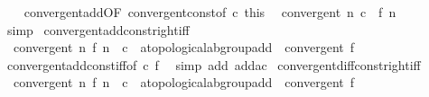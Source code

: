 \begin{isabellebody}
\ \ \isamarkupfalse%
\ convergent{\isacharunderscore}{\kern0pt}add{\isacharbrackleft}{\kern0pt}OF\ convergent{\isacharunderscore}{\kern0pt}const{\isacharbrackleft}{\kern0pt}of\ c{\isacharbrackright}{\kern0pt}\ this{\isacharbrackright}{\kern0pt}\ \isamarkupfalse%
\ {\isachardoublequoteopen}convergent\ {\isacharparenleft}{\kern0pt}{\isasymlambda}n{\isachardot}{\kern0pt}\ c\ {\isacharplus}{\kern0pt}\ f\ n{\isacharparenright}{\kern0pt}{\isachardoublequoteclose}\isanewline
\ \ \ \ \isamarkupfalse%
\ simp\isanewline
{}\isamarkupfalse%
%
\endisatagproof
{\isafoldproof}%
%
\isadelimproof
\isanewline
%
\endisadelimproof
\isanewline
{}\isamarkupfalse%
\ convergent{\isacharunderscore}{\kern0pt}add{\isacharunderscore}{\kern0pt}const{\isacharunderscore}{\kern0pt}right{\isacharunderscore}{\kern0pt}iff{\isacharcolon}{\kern0pt}\isanewline
\ \ {\isachardoublequoteopen}convergent\ {\isacharparenleft}{\kern0pt}{\isasymlambda}n{\isachardot}{\kern0pt}\ f\ n\ {\isacharplus}{\kern0pt}\ c\ {\isacharcolon}{\kern0pt}{\isacharcolon}{\kern0pt}\ {\isacharprime}{\kern0pt}a{\isacharcolon}{\kern0pt}{\isacharcolon}{\kern0pt}topological{\isacharunderscore}{\kern0pt}ab{\isacharunderscore}{\kern0pt}group{\isacharunderscore}{\kern0pt}add{\isacharparenright}{\kern0pt}\ {\isasymlongleftrightarrow}\ convergent\ f{\isachardoublequoteclose}\isanewline
%
\isadelimproof
\ \ %
\endisadelimproof
%
\isatagproof
{}\isamarkupfalse%
\ convergent{\isacharunderscore}{\kern0pt}add{\isacharunderscore}{\kern0pt}const{\isacharunderscore}{\kern0pt}iff{\isacharbrackleft}{\kern0pt}of\ c\ f{\isacharbrackright}{\kern0pt}\ \isamarkupfalse%
\ {\isacharparenleft}{\kern0pt}simp\ add{\isacharcolon}{\kern0pt}\ add{\isacharunderscore}{\kern0pt}ac{\isacharparenright}{\kern0pt}%
\endisatagproof
{\isafoldproof}%
%
\isadelimproof
\isanewline
%
\endisadelimproof
\isanewline
{}\isamarkupfalse%
\ convergent{\isacharunderscore}{\kern0pt}diff{\isacharunderscore}{\kern0pt}const{\isacharunderscore}{\kern0pt}right{\isacharunderscore}{\kern0pt}iff{\isacharcolon}{\kern0pt}\isanewline
\ \ {\isachardoublequoteopen}convergent\ {\isacharparenleft}{\kern0pt}{\isasymlambda}n{\isachardot}{\kern0pt}\ f\ n\ {\isacharminus}{\kern0pt}\ c\ {\isacharcolon}{\kern0pt}{\isacharcolon}{\kern0pt}\ {\isacharprime}{\kern0pt}a{\isacharcolon}{\kern0pt}{\isacharcolon}{\kern0pt}topological{\isacharunderscore}{\kern0pt}ab{\isacharunderscore}{\kern0pt}group{\isacharunderscore}{\kern0pt}add{\isacharparenright}{\kern0pt}\ {\isasymlongleftrightarrow}\ convergent\ f{\isachardoublequoteclose}\isanewline

\end{isabellebody}
